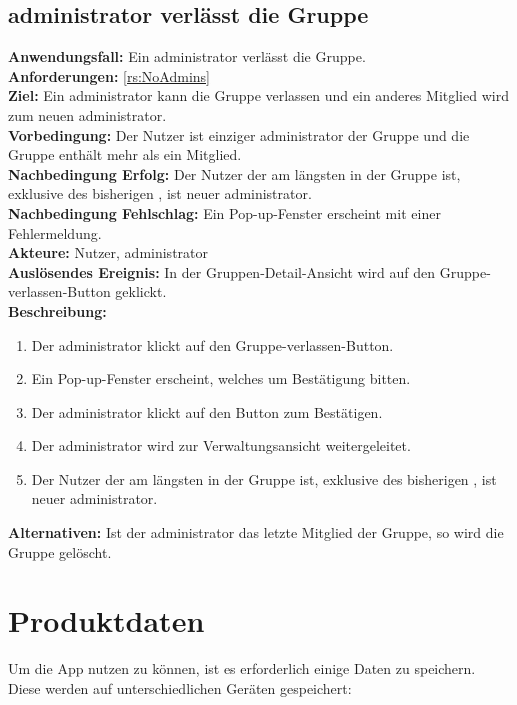 \documentclass[parskip=full]{scrartcl}
\newcommand{\changelocaltocdepth}[1]{%
  \addtocontents{toc}{\protect\setcounter{tocdepth}{#1}}%
  \setcounter{tocdepth}{#1}%
}
\newcommand{\enablesubsectionnumbering}[1]{
    \renewcommand{\thesubsection}{$\langle$#1\arabic{subsection}0$\rangle$}
    \changelocaltocdepth{1} 
}
\newcommand{\resetsubsectionnumbering}{
    \renewcommand{\thesubsection}{\arabic{section}.\arabic{subsection}}
    \changelocaltocdepth{3} 
}
\begin{document}
\subsection{\Gls{administrator} verlässt die Gruppe}
\textbf{Anwendungsfall:} Ein \Gls{administrator} verlässt die Gruppe.\\
\textbf{Anforderungen:} \ref{rs:NoAdmins}\\
\textbf{Ziel:} Ein \Gls{administrator} kann die Gruppe verlassen und ein anderes Mitglied wird zum neuen \Gls{administrator}.\\
\textbf{Vorbedingung:} Der Nutzer ist einziger \Gls{administrator} der Gruppe und die Gruppe enthält mehr als ein Mitglied.\\
\textbf{Nachbedingung Erfolg:} Der Nutzer der am längsten in der Gruppe ist, exklusive des bisherigen , ist neuer \Gls{administrator}.\\
\textbf{Nachbedingung Fehlschlag:} Ein Pop-up-Fenster erscheint mit einer Fehlermeldung.\\
\textbf{Akteure:} Nutzer, \Gls{administrator}\\
\textbf{Auslösendes Ereignis:} In der Gruppen-Detail-Ansicht wird auf den Gruppe-verlassen-Button geklickt.\\
\textbf{Beschreibung:}
\begin{enumerate}
    \item Der \Gls{administrator} klickt auf den Gruppe-verlassen-Button.
    \item Ein Pop-up-Fenster erscheint, welches um Bestätigung bitten.
    \item Der \Gls{administrator} klickt auf den Button zum Bestätigen.
    \item Der \Gls{administrator} wird zur Verwaltungsansicht weitergeleitet.
    \item Der Nutzer der am längsten in der Gruppe ist, exklusive des bisherigen , ist neuer \Gls{administrator}. 
\end{enumerate}
\textbf{Alternativen:} Ist der \Gls{administrator} das letzte Mitglied der Gruppe, so wird die Gruppe gelöscht.
\newpage


\resetsubsectionnumbering


\section{Produktdaten}
\enablesubsectionnumbering{D}
Um die App nutzen zu können, ist es erforderlich einige Daten zu speichern. Diese werden auf unterschiedlichen Geräten gespeichert:
\end{document}
